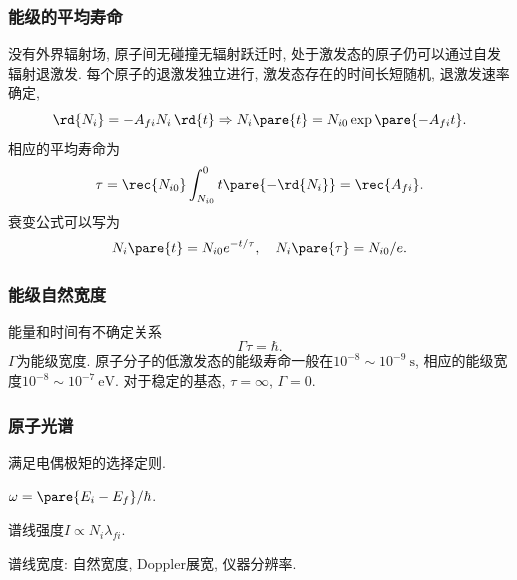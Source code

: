 \documentclass[hidelinks]{ctexart}
\begin{document}
\subsubsection{能级的平均寿命} %
\label{ssub:能级的平均寿命}

没有外界辐射场, 原子间无碰撞无辐射跃迁时, 处于激发态的原子仍可以通过自发辐射退激发. 每个原子的退激发独立进行, 激发态存在的时间长短随机, 退激发速率确定,
\[ \rd{N_i} = -A_{fi}N_i \,\rd{t} \Rightarrow N_i\pare{t} = N_{i0} \exp\pare{-A_{fi}t}. \]
相应的平均寿命为
\[ \tau = \rec{N_{i0}} \int_{N_{i0}}^0 t\pare{-\rd{N_i}} = \rec{A_{fi}}. \]
衰变公式可以写为
\[ N_i\pare{t} = N_{i0}e^{-t/\tau},\quad N_i\pare{\tau} = N_{i0}/e. \]


\subsubsection{能级自然宽度} %
\label{ssub:能级自然宽度}

能量和时间有不确定关系
\[ \Gamma \tau = \hbar. \]
$\Gamma$为能级宽度. 原子分子的低激发态的能级寿命一般在$10^{-8}\sim 10^{-9}\SI{}{\second}$, 相应的能级宽度$10^{-8}\sim 10^{-7}\SI{}{\eV}$. 对于稳定的基态, $\tau = \infty$, $\Gamma = 0$.


\subsubsection{原子光谱} %
\label{ssub:原子光谱}

\begin{cenum}
    \item 满足电偶极矩的选择定则.
    \item $\omega = \pare{E_i - E_f}/\hbar$.
    \item 谱线强度$I \propto N_i \lambda_{fi}$.
    \item 谱线宽度: 自然宽度, Doppler展宽, 仪器分辨率.
\end{cenum}



\end{document}
